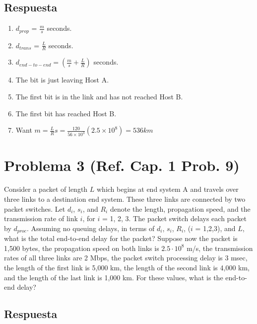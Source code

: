 \documentclass[10pt,spanish]{article}
\numberwithin{figure}{section} %
\begin{document}
\subsection*{Respuesta}

\begin{enumerate}
\item $d_{prop}$ = $\displaystyle \frac{m}{s}$ seconds.
\item $d_{trans}$ = $\displaystyle \frac{L}{R}$ seconds.
\item $\displaystyle d_{end-to-end} = \left( \frac{m}{s} + \frac{L}{R} \right)$ seconds.
\item The bit is just leaving Host A.
\item The first bit is in the link and has not reached Host B.
\item The first bit has reached Host B.
\item Want $\displaystyle m = \frac{L}{R} s = \frac{120}{56 \times 10^3} (2.5 \times 10^8) = 536 km$
\end{enumerate}

\section[Problema 3]{Problema 3 \textnormal{\Large{(Ref. Cap. 1 Prob. 9)}}}
Consider a packet of length $L$ which begins at end system A and travels over three links to a destination end system. These three links are connected by two packet switches. Let $d_i$, $s_i$, and $R_i$ denote the length, propagation speed, and the transmission rate of link $i$, for $i$ = 1, 2, 3. The packet switch delays each packet by $d_{proc}$. Assuming no queuing delays, in terms of $d_i$, $s_i$, $R_i$, ($i$ = 1,2,3), and $L$, what is the total end-to-end delay for the packet? Suppose now the packet is 1,500 bytes, the propagation speed on both links is $2.5 \cdot 10^8$ m/s, the transmission rates of all three links are 2 Mbps, the packet switch processing delay is 3 msec, the length of the first link is 5,000 km, the length of the second link is 4,000 km, and the length of the last link is 1,000 km. For these values, what is the end-to-end delay?

\subsection*{Respuesta}
\end{document}
